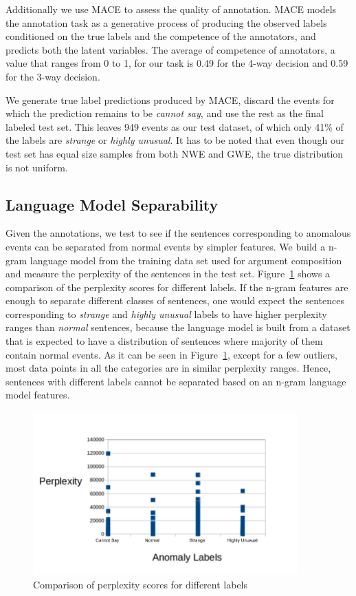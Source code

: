 Additionally we use
MACE \cite{hovy2013learning} to assess the quality of 
annotation.  MACE models the annotation task as a generative process of
producing the observed labels conditioned on the 
true labels and the competence of the annotators, and predicts both the latent
variables.  The average of competence of annotators, 
a value that ranges from 0 to 1, for our task is 0.49 for the 4-way decision and
0.59 for the 3-way decision.  

We generate
true label predictions produced by MACE, discard the events for which the
prediction remains to be \textit{cannot say}, and use the 
rest as the final labeled test set.  This leaves 949 events as our test dataset,
of which only 41\% of the labels are \textit{strange} or \textit{highly
unusual}.  It has to be noted that even though our test set 
has equal size samples from both NWE and GWE, the true distribution is not
uniform.

\subsection{Language Model Separability}
Given the annotations, we test to see if the
sentences corresponding to anomalous events can be separated from normal events 
by simpler 
features.  We build a n-gram language model from the training data set used for 
argument composition and 
measure the perplexity of the sentences in the test set.  
Figure~\ref{fig:nem_lm_ppl} shows
a comparison of the perplexity scores for different labels. If the n-gram 
features are enough 
to separate different classes of sentences, one would expect the sentences 
corresponding to 
\textit{strange} and \textit{highly unusual} labels to have higher perplexity 
ranges than \textit{normal}
sentences, because the language model is built from a dataset that is expected 
to have a distribution of
sentences where majority of them contain normal events.  As it can be seen in 
Figure~\ref{fig:nem_lm_ppl}, 
except for a few outliers, most data points in all the categories are in similar 
perplexity ranges.
Hence, sentences with different labels cannot be separated based on an n-gram 
language model features.

\begin{figure}
  \begin{center}
  \includegraphics[width=4in]{figures/perplexity-comparison.png}
  \caption{Comparison of perplexity scores for different labels}
  \label{fig:nem_lm_ppl}
  \end{center}
\end{figure}

